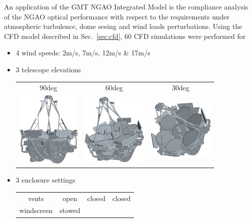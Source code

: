 \documentclass[]{AO4ELT}  %
\begin{document}
An application of the GMT NGAO Integrated Model is the compliance analysis of the NGAO optical performance with respect to the requirements under atmospheric turbulence, dome seeing and wind loads perturbations.
Using the CFD model described in Sec.~\ref{sec:cfd}, 60 CFD simulations were performed for
\begin{itemize}
   \item 4 wind speeds: 2m/s, 7m/s, 12m/s \& 17m/s
   \item 3 telescope elevations
         \begin{tabular}{ccc}
            90deg                                                             & 60deg & 30deg \\
            \includegraphics[width=0.2\linewidth]{./figures/zen00az000_OS7_tel_tr.png}  &
            \includegraphics[width=0.2\linewidth]{./figures/zen30az000_CD12_tel_tr.png} &
            \includegraphics[width=0.2\linewidth]{./figures/zen60az000_CS17_tel_tr.png}
         \end{tabular}
   \item 3 enclosure settings
         \begin{tabular}{cccc}
            vents                                                         & open                                                         &
            closed                                                        &
            closed                                                                                                                         \\
            windscreen                                                    & stowed                                                       &

\end{tabular}
\end{itemize}
\end{document}
